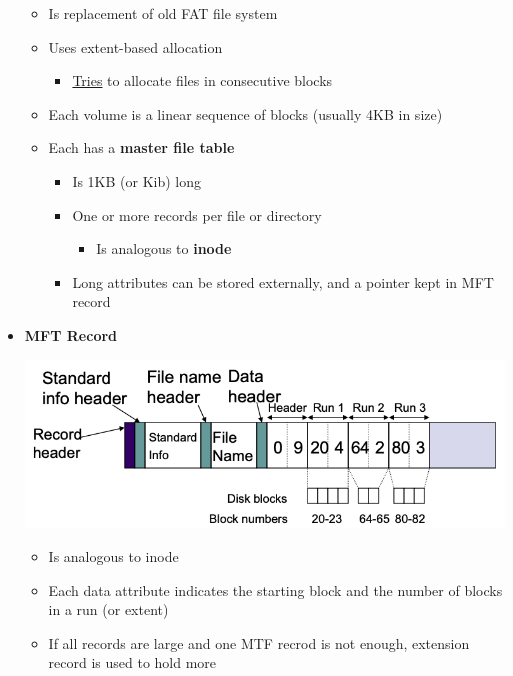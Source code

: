 \documentclass[12pt]{article}
\begin{document}
\begin{itemize}
    \begin{itemize}
        \item Is replacement of old FAT file system
        \item Uses extent-based allocation
        \begin{itemize}
            \item \underline{Tries} to allocate files in consecutive blocks
        \end{itemize}
        \item Each volume is a linear sequence of blocks (usually 4KB in size)
        \item Each has a \textbf{master file table}
        \begin{itemize}
            \item Is 1KB (or Kib) long
            \item One or more records per file or directory
            \begin{itemize}
                \item Is analogous to \textbf{inode}
            \end{itemize}
            \item Long attributes can be stored externally, and a pointer kept in MFT record
        \end{itemize}
    \end{itemize}

    \item \textbf{MFT Record}

    \begin{center}
    \includegraphics[width=0.6\linewidth]{images/notes_10.png}
    \end{center}

    \begin{itemize}
        \item Is analogous to inode
        \item Each data attribute indicates the starting block and the number of blocks in a run (or extent)
        \item If all records are large and one MTF recrod is not enough, extension record is used to hold more
    \end{itemize}
\end{itemize}
\end{document}
